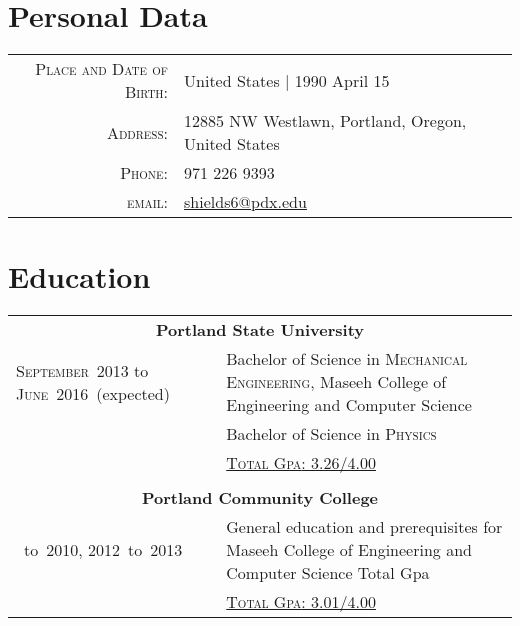 \documentclass[letterpaper]{article}
\begin{document}
\par{\bigskip\par} %


\section{Personal Data}
\begin{center}
\begin{tabular}{rl}
\textsc{Place and Date of Birth:} & United States  | 1990 April 15 \\
\textsc{Address:} & 12885 NW Westlawn, Portland, Oregon, United States \\
\textsc{Phone:} & 971 226 9393\\
\textsc{email:} & \href{mailto:shields6@pdx.edu}{shields6@pdx.edu}
\end{tabular}
\end{center}


\section{Education}
\begin{center}
\begin{tabular}{p{}p{}}

\multicolumn{2}{c}{\bfseries Portland State University}	\\
\textsc{September~2013} to \textsc{June~2016}~(expected) 
& Bachelor of Science in \textsc{Mechanical Engineering}, Maseeh College of Engineering and Computer Science	\\
& Bachelor of Science in \textsc{Physics}	\\
& \hyperlink{grds:psu:phys}{\textsc{Total Gpa}: 3.26/4.00}	\\
&\\


\multicolumn{2}{c}{\bfseries Portland Community College}	\\
\raggedleft 2008~to~2010, 2012~to~2013 
& General education and prerequisites for Maseeh College of Engineering and Computer Science	Total Gpa\\
& \hyperlink{grds:pcc}{\textsc{Total Gpa}: 3.01/4.00}	\\

\end{tabular}
\end{center}
\end{document}
